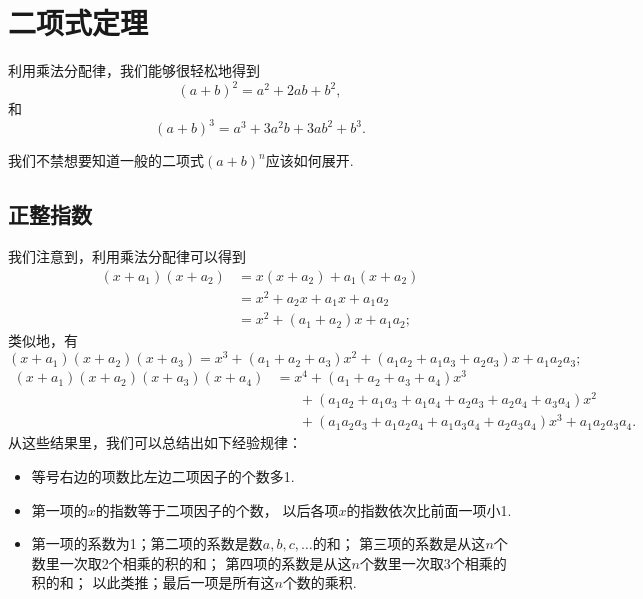 \section{二项式定理}
利用乘法分配律，我们能够很轻松地得到%
\begin{equation}
	(a + b)^2 = a^2 + 2ab + b^2,
\end{equation}
和%
\begin{equation}
	(a + b)^3 = a^3 + 3 a^2 b + 3 a b^2 + b^3.
\end{equation}

我们不禁想要知道一般的二项式\((a+b)^n\)应该如何展开.

\subsection{正整指数}
我们注意到，利用乘法分配律可以得到\begin{align*}
	(x+a_1)(x+a_2)
	&= x(x+a_2) + a_1(x+a_2) \\
	&= x^2 + a_2x + a_1x + a_1a_2 \\
	&= x^2 + (a_1+a_2)x + a_1a_2;
\end{align*}
类似地，有\[
	(x+a_1)(x+a_2)(x+a_3)
	= x^3 + (a_1+a_2+a_3)x^2 + (a_1a_2+a_1a_3+a_2a_3)x + a_1a_2a_3;
\]\begin{align*}
	(x+a_1)(x+a_2)(x+a_3)(x+a_4)
	&= x^4 + (a_1+a_2+a_3+a_4)x^3 \\
		&\hspace{20pt}+ (a_1a_2+a_1a_3+a_1a_4+a_2a_3+a_2a_4+a_3a_4)x^2 \\
		&\hspace{20pt}+ (a_1a_2a_3+a_1a_2a_4+a_1a_3a_4+a_2a_3a_4)x^3 + a_1a_2a_3a_4.
\end{align*}
从这些结果里，我们可以总结出如下经验规律：
\begin{itemize}
	\item 等号右边的项数比左边二项因子的个数多1.
	\item 第一项的\(x\)的指数等于二项因子的个数，
	以后各项\(x\)的指数依次比前面一项小1.
	\item 第一项的系数为1；第二项的系数是数\(a,b,c,\dotsc\)的和；
	第三项的系数是从这\(n\)个数里一次取2个相乘的积的和；
	第四项的系数是从这\(n\)个数里一次取3个相乘的积的和；
	以此类推；最后一项是所有这\(n\)个数的乘积.
\end{itemize}

